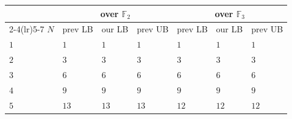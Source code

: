 \documentclass[11pt]{article}
\theoremstyle{definition}
\newcommand{\F}{\mathbb{F}}
\begin{document}
\begin{table}[!ht]
  \centering
  \setlength{\tabcolsep}{6pt}
  \begin{tabular}{lllllll}
    \toprule
    & \multicolumn{3}{c}{over $\F_2$}                                               & \multicolumn{3}{c}{over $\F_3$}                                                                                                                                                                                       \\
    \cmidrule(lr){2-4}\cmidrule(lr){5-7}
    $N$ & prev LB                                                                       & our LB                          & prev UB                                      & prev LB                                                                      & our LB       & prev UB                                \\
    \midrule
    $1$ & $1$                                                                           & $1$                             & $1$                                          & $1$                                                                          & $1$          & $1$                                    \\
    $2$ & $3$~\cite{fiduccia1977algebras}                                               & $3$                             & $3$~\cite{toom1963complexity}                & $3$~\cite{fiduccia1977algebras}                                              & $3$          & $3$~\cite{toom1963complexity}          \\
    $3$ & $6$~\cite{lempel1983complexity,chudnovsky1988algebraic,griesmer1960bound}     & $6$                             & $6$~\cite{kaminski1989multiplicative}        & $6$~\cite{lempel1983complexity,chudnovsky1988algebraic,grassl2007codetables} & $6$          & $6$~\cite{kaminski1989multiplicative}  \\
    $4$ & $9$~\cite{kaminski1989multiplicative}                                         & $9$                             & $9$~\cite{kaminski1989multiplicative}        & $9$~\cite{kaminski1989multiplicative}                                        & $9$          & $9$~\cite{kaminski1989multiplicative}  \\
    $5$ & $13$~\cite{lempel1983complexity,chudnovsky1988algebraic,grassl2007codetables} & $13$                            & $13$~\cite{montgomery2005five}               & $12$~\cite{kaminski1989multiplicative}                                       & $12$         & $12$~\cite{kaminski1989multiplicative} \\

\end{tabular}
\end{table}
\end{document}
